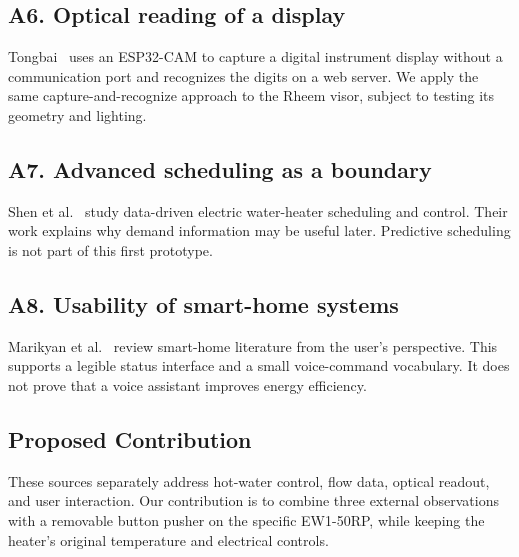 \subsection*{A6. Optical reading of a display}
Tongbai~\cite{tongbai2024} uses an ESP32-CAM to capture a digital instrument display without a communication port and recognizes the digits on a web server. We apply the same capture-and-recognize approach to the Rheem visor, subject to testing its geometry and lighting.

\subsection*{A7. Advanced scheduling as a boundary}
Shen et al.~\cite{shen2021} study data-driven electric water-heater scheduling and control. Their work explains why demand information may be useful later. Predictive scheduling is not part of this first prototype.

\subsection*{A8. Usability of smart-home systems}
Marikyan et al.~\cite{marikyan2019} review smart-home literature from the user's perspective. This supports a legible status interface and a small voice-command vocabulary. It does not prove that a voice assistant improves energy efficiency.

\subsection{Proposed Contribution}
These sources separately address hot-water control, flow data, optical readout, and user interaction. Our contribution is to combine three external observations with a removable button pusher on the specific EW1-50RP, while keeping the heater's original temperature and electrical controls.
